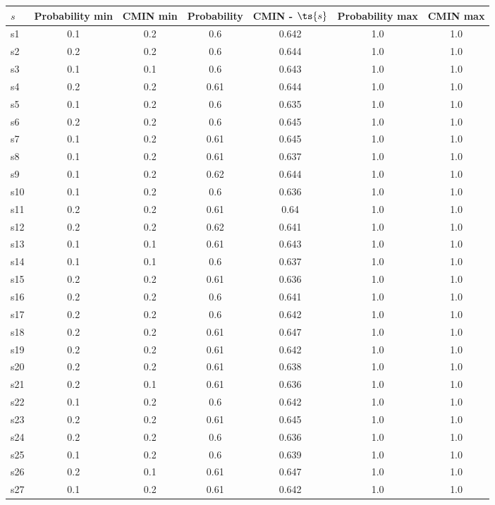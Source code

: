 \documentclass{article}
\begin{document}
\noindent\begin{tabular}{|l|c|c|c|c|c|c|}
\hline
$s$& Probability min & CMIN min & Probability & CMIN - $\ts{s}$ & Probability max & CMIN max\\
\hline
s1 &0.1 & 0.2 & 0.6 & 0.642 & 1.0 & 1.0\\
\hline
s2 &0.2 & 0.2 & 0.6 & 0.644 & 1.0 & 1.0\\
\hline
s3 &0.1 & 0.1 & 0.6 & 0.643 & 1.0 & 1.0\\
\hline
s4 &0.2 & 0.2 & 0.61 & 0.644 & 1.0 & 1.0\\
\hline
s5 &0.1 & 0.2 & 0.6 & 0.635 & 1.0 & 1.0\\
\hline
s6 &0.2 & 0.2 & 0.6 & 0.645 & 1.0 & 1.0\\
\hline
s7 &0.1 & 0.2 & 0.61 & 0.645 & 1.0 & 1.0\\
\hline
s8 &0.1 & 0.2 & 0.61 & 0.637 & 1.0 & 1.0\\
\hline
s9 &0.1 & 0.2 & 0.62 & 0.644 & 1.0 & 1.0\\
\hline
s10 &0.1 & 0.2 & 0.6 & 0.636 & 1.0 & 1.0\\
\hline
s11 &0.2 & 0.2 & 0.61 & 0.64 & 1.0 & 1.0\\
\hline
s12 &0.2 & 0.2 & 0.62 & 0.641 & 1.0 & 1.0\\
\hline
s13 &0.1 & 0.1 & 0.61 & 0.643 & 1.0 & 1.0\\
\hline
s14 &0.1 & 0.1 & 0.6 & 0.637 & 1.0 & 1.0\\
\hline
s15 &0.2 & 0.2 & 0.61 & 0.636 & 1.0 & 1.0\\
\hline
s16 &0.2 & 0.2 & 0.6 & 0.641 & 1.0 & 1.0\\
\hline
s17 &0.2 & 0.2 & 0.6 & 0.642 & 1.0 & 1.0\\
\hline
s18 &0.2 & 0.2 & 0.61 & 0.647 & 1.0 & 1.0\\
\hline
s19 &0.2 & 0.2 & 0.61 & 0.642 & 1.0 & 1.0\\
\hline
s20 &0.2 & 0.2 & 0.61 & 0.638 & 1.0 & 1.0\\
\hline
s21 &0.2 & 0.1 & 0.61 & 0.636 & 1.0 & 1.0\\
\hline
s22 &0.1 & 0.2 & 0.6 & 0.642 & 1.0 & 1.0\\
\hline
s23 &0.2 & 0.2 & 0.61 & 0.645 & 1.0 & 1.0\\
\hline
s24 &0.2 & 0.2 & 0.6 & 0.636 & 1.0 & 1.0\\
\hline
s25 &0.1 & 0.2 & 0.6 & 0.639 & 1.0 & 1.0\\
\hline
s26 &0.2 & 0.1 & 0.61 & 0.647 & 1.0 & 1.0\\
\hline
s27 &0.1 & 0.2 & 0.61 & 0.642 & 1.0 & 1.0\\

\end{tabular}
\end{document}
